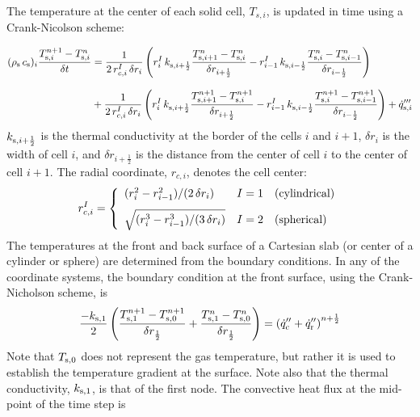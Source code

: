 The temperature at the center of each solid cell, $T_{s,i}$, is updated in time using a Crank-Nicolson scheme:

\begin{align}
\label{crank-nicolson}
(\rho_{\rm s} \, c_{\rm s})_i \frac{T_{{\rm s},i}^{n+1}-T_{{\rm s},i}^{n}}{\delta t}
& = \frac{1}{2 \, r_{c,i}^I \, \delta r_i} \left( r_{i}^{I} \, k_{{\rm s},i+\frac{1}{2}} \frac{T_{{\rm s},i+1}^{n}-T_{{\rm s},i}^{n}}{\delta r_{i+\frac{1}{2}}} - r_{i-1}^{I} \, k_{{\rm s},i-\frac{1}{2}} \frac{T_{{\rm s},i}^{n}-T_{{\rm s},i-1}^{n}}{\delta r_{i-\frac{1}{2}}} \right) \notag \\[0.1in]
& +\frac{1}{2 \, r_{c,i}^I \, \delta r_i} \left( r_{i}^{I} \, k_{{\rm s},i+\frac{1}{2}} \frac{T_{{\rm s},i+1}^{n+1}-T_{{\rm s},i}^{n+1}}{\delta r_{i+\frac{1}{2}}} - r_{i-1}^{I} \, k_{{\rm s},i-\frac{1}{2}} \frac{T_{{\rm s},i}^{n+1}-T_{{\rm s},i-1}^{n+1}}{\delta r_{i-\frac{1}{2}}} \right) + \dot{q}'''_{{\rm s},i}
\end{align}
$k_{{\rm s},i+\frac{1}{2}}$ is the thermal conductivity at the border of the cells $i$ and $i+1$, $\delta r_i$ is the width of cell $i$, and  $\delta r_{i+\frac{1}{2}}$ is the distance from the center of cell $i$ to the center of cell $i+1$. The radial coordinate, $r_{c,i}$, denotes the cell center:
\begin{equation}
r_{c,i}^I = \left\{
\begin{array}{ll} (r_i^2 - r_{i-1}^2)/(2 \, \delta r_i)            & I=1 \quad \hbox{(cylindrical)} \\ [0.1in]
                   \sqrt{ ( r_i^3 - r_{i-1}^3)/(3 \, \delta r_i) } & I=2 \quad \hbox{(spherical)}
\end{array} \right.
\end{equation}
The temperatures at the front and back surface of a Cartesian slab (or center of a cylinder or sphere) are determined from the boundary conditions. In any of the coordinate systems, the boundary condition at the front surface, using the Crank-Nicholson scheme, is
\begin{equation}
\label{bc_front}
 \frac{-k_{\rm s,1}}{2} \left( \frac{T_{\rm s,1}^{n+1}-T_{\rm s,0}^{n+1}}{\delta r_{\frac{1}{2}}} + \frac{T_{\rm s,1}^{n}-T_{\rm s,0}^{n}}{\delta r_{\frac{1}{2}}} \right)
  =  \left( \dot{q}_{\rm c}''+\dot{q}_{\rm r}'' \right)^{n+\frac{1}{2}}
\end{equation}
Note that $T_{\rm s,0}$ does not represent the gas temperature, but rather it is used to establish the temperature gradient at the surface. Note also that the thermal conductivity, $k_{\rm s,1}$, is that of the first node. The convective heat flux at the mid-point of the time step is
